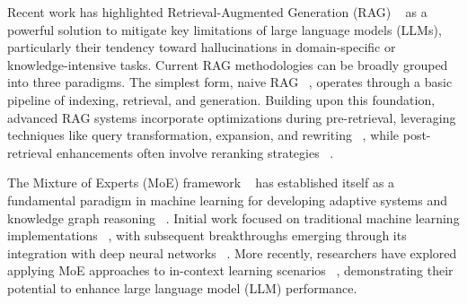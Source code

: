 

Recent work has highlighted Retrieval-Augmented Generation (RAG) ~\cite{gao-rag} as a powerful solution to mitigate key limitations of large language models (LLMs), particularly their tendency toward hallucinations in domain-specific or knowledge-intensive tasks. Current RAG methodologies can be broadly grouped into three paradigms. The simplest form, naive RAG ~\cite{ma-rag}, operates through a basic pipeline of indexing, retrieval, and generation. Building upon this foundation, advanced RAG systems incorporate optimizations during pre-retrieval, leveraging techniques like query transformation, expansion, and rewriting ~\cite{peng-rewriting,zheng-rewriting}, while post-retrieval enhancements often involve reranking strategies ~\cite{qin-rerank}. 

The Mixture of Experts (MoE) framework ~\cite{moe} has established itself as a fundamental paradigm in machine learning for developing adaptive systems and knowledge graph reasoning ~\cite{liu2019g,liu2021neural,liu2021kompare,liu2022joint,liu2022comparative,liu2022knowledge,liu2023knowledge,liu2023knowledge,hill2024ginkgo,liu2024logic,liu2024can,liu2024new,liu2024conversational,liu2025neural,liu2025few,wu2025improving,liu2025monte,liu2025hyperkgr,liu2025mixrag,liu2024knowledge,liu2026neural,liuneural,liu2026accurate,liu2026ambiguous,liu2026accurate,liu2026ambiguous,liu2025unifying,liu2026dynamic,liu2026accurate,liu2026symbolic,liu2025graph}. Initial work focused on traditional machine learning implementations ~\cite{NIPS1996_6c8dba7d}, with subsequent breakthroughs emerging through its integration with deep neural networks ~\cite{gcn}.
More recently, researchers have explored applying MoE approaches to in-context learning scenarios ~\cite{onepromptisnotenough}, demonstrating their potential to enhance large language model (LLM) performance. 